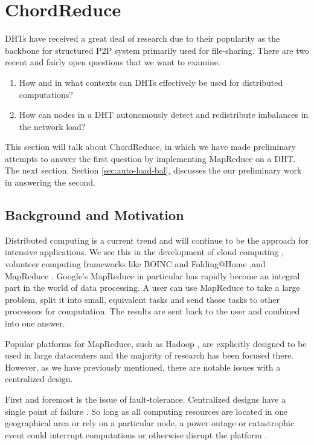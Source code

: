 \section{ChordReduce}
DHTs have received a great deal of research due to their popularity as the backbone for structured P2P system primarily used for file-sharing.
There are two recent and fairly open questions that we want to examine.

\begin{enumerate}
	\item How and in what contexts  can DHTs effectively be used for distributed computations?
	\item How can nodes in a DHT autonomously detect and redistribute imbalances in the network load?
\end{enumerate}

This section will talk about ChordReduce, in which we have made preliminary attempts to answer the first question by implementing MapReduce on a DHT.
The next section, Section \ref{sec:auto-load-bal}, discusses the our preliminary work in answering the second.

\subsection{Background and Motivation}

Distributed computing is a current trend and will continue to be the approach for intensive  applications.
We see this in the development of cloud computing \cite{p2p-cloud}, volunteer computing frameworks like BOINC \cite{anderson2004boinc} and Folding@Home \cite{larson2002folding},and MapReduce  \cite{mapreduce}.
Google's MapReduce  in particular has rapidly become an integral part in the world of data processing.
A user can use MapReduce to take a large problem, split it into small, equivalent tasks and send those tasks to other processors for computation.
The results are sent back to the user and combined into one answer.

Popular platforms for MapReduce, such as Hadoop \cite{hadoop}  \cite{shvachko2010hadoop}, are explicitly designed to be used in large datacenters \cite{hadoopAssumptions} and the majority of research has been focused there.
However, as we have previously mentioned, there are notable issues with a centralized design.

First and foremost is the issue of fault-tolerance.
Centralized designs have a single point of failure \cite{shvachko2010hadoop}.
So long as all computing resources are located in one geographical area or rely on a particular node, a power outage or catastrophic event could interrupt computations or otherwise disrupt the platform \cite{babaoglu2014people}.

